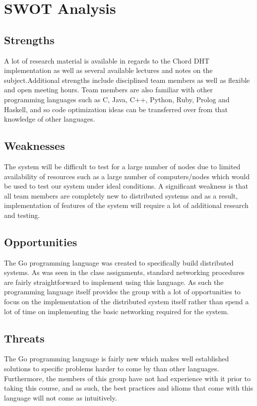 \documentclass[fleqn,24pt]{SelfArx} %
\begin{document}
\section{SWOT Analysis}

\subsection{Strengths}
A lot of research material is available in regards to the Chord DHT implementation as well as several available lectures and notes on the subject.Additional strengths include disciplined team members as well as flexible and open meeting hours. Team members are also familiar with other programming languages such as C, Java, C++, Python, Ruby, Prolog and Haskell, and so code optimization ideas can be transferred over from that knowledge of other languages.

\subsection{Weaknesses}
The system will be difficult to test for a large number of nodes due to limited availability of resources such as a large number of computers/nodes which would be used to test our system under ideal conditions. A significant weakness is that all team members are completely new to distributed systems and as a result, implementation of features of the system will require a lot of additional research and testing.

\subsection{Opportunities}
The Go programming language was created to specifically build distributed systems. As was seen in the class assignments, standard networking procedures are fairly straightforward to implement using this language. As such the programming language itself provides the group with a lot of opportunities to focus on the implementation of the distributed system itself rather than spend a lot of time on implementing the basic networking required for the system.

\subsection{Threats}
The Go programming language is fairly new which makes well established solutions to specific problems harder to come by than other languages. Furthermore, the members of this group have not had experience with it prior to taking this course, and as such, the best practices and idioms that come with this language will not come as intuitively. 
\end{document}
